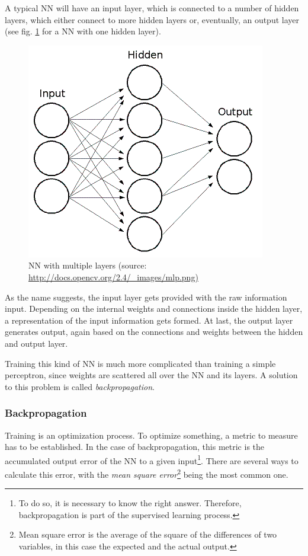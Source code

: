 A typical NN will have an input layer, which is connected to a number of hidden layers, which either connect to more hidden layers or, eventually, an output layer (see fig. \ref{fig2_multilayeredNN} for a NN with one hidden layer).

\begin{figure}[H]
	\begin{center}
		\includegraphics[scale=0.8]{img/mlp.png}
		\caption{NN with multiple layers (source: \url{http://docs.opencv.org/2.4/_images/mlp.png)}}
		\label{fig2_multilayeredNN}
	\end{center}
\end{figure}

As the name suggests, the input layer gets provided with the raw information input. Depending on the internal weights and connections inside the hidden layer, a representation of the input information gets formed. At last, the output layer generates output, again based on the connections and weights between the hidden and output layer\cite{Stergiou96}.

Training this kind of NN is much more complicated than training a simple perceptron, since weights are scattered all over the NN and its layers. A solution to this problem is called \emph{backpropagation}\cite{Shiffman12}.


\subsubsection{Backpropagation}
Training is an optimization process. To optimize something, a metric to measure has to be established. In the case of backpropagation, this metric is the accumulated output error of the NN to a given input\footnote{To do so, it is necessary to know the right answer. Therefore, backpropagation is part of the supervised learning process.}. There are several ways to calculate this error, with the \emph{mean square error}\footnote{Mean square error is the average of the square of the differences of two variables, in this case the expected and the actual output.} being the most common one\cite{Bourg04}.

